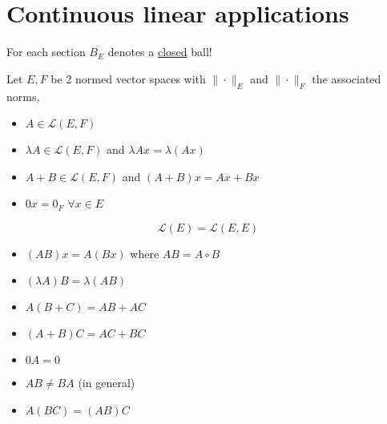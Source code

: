 \section{Continuous linear applications}
For each section $B_E$ denotes a \underline{closed} ball!
\par
Let $E, F$ be 2 normed vector spaces with $\| \cdot \|_{E}$ and $\| \cdot \|_{F}$ the associated norms, 
\begin{itemize}
    \item $A \in \mathcal{L}(E, F)$
    \item $\lambda A \in \mathcal{L}(E, F)$ and $\lambda Ax = \lambda(Ax)$
    \item  $A + B \in \mathcal{L}(E, F)$ and $(A + B)x = Ax + Bx$
    \item  $0x = 0_F$  $\forall x \in E$
\end{itemize}
\[
    \mathcal{L}(E) = \mathcal{L}(E, E)
\] 
\begin{itemize}
    \item $(AB)x = A(Bx)$ where $AB = A \circ B$
    \item  $(\lambda A)B = \lambda (AB)$
    \item  $A(B + C) = AB + AC$
    \item  $(A + B)C = AC + BC$
    \item  $0A = 0$ 
    \item $AB \neq BA$ (in general)
    \item $A(BC) = (AB)C$
\end{itemize}

